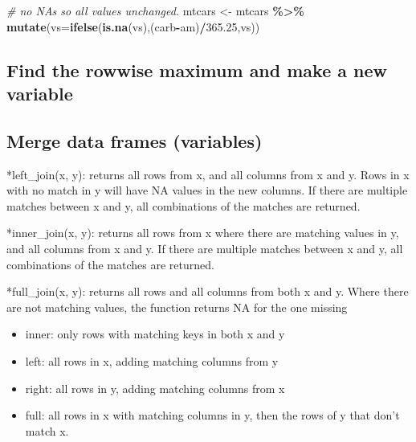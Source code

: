 \documentclass[
]{article}
\newenvironment{Shaded}{\begin{snugshade}}{\end{snugshade}}
\newcommand{\AttributeTok}[1]{\textcolor[rgb]{0.13,0.29,0.53}{#1}}
\newcommand{\CommentTok}[1]{\textcolor[rgb]{0.56,0.35,0.01}{\textit{#1}}}
\newcommand{\FloatTok}[1]{\textcolor[rgb]{0.00,0.00,0.81}{#1}}
\newcommand{\FunctionTok}[1]{\textcolor[rgb]{0.13,0.29,0.53}{\textbf{#1}}}
\newcommand{\NormalTok}[1]{#1}
\newcommand{\OtherTok}[1]{\textcolor[rgb]{0.56,0.35,0.01}{#1}}
\newcommand{\SpecialCharTok}[1]{\textcolor[rgb]{0.81,0.36,0.00}{\textbf{#1}}}
\providecommand{\tightlist}{%
  \setlength{\itemsep}{0pt}\setlength{\parskip}{0pt}}
\begin{document}
\begin{Shaded}
\begin{Highlighting}[]
\CommentTok{\# no NA\textquotesingle{}s so all values unchanged.}
\NormalTok{mtcars }\OtherTok{\textless{}{-}}\NormalTok{ mtcars }\SpecialCharTok{\%\textgreater{}\%} \FunctionTok{mutate}\NormalTok{(}\AttributeTok{vs=}\FunctionTok{ifelse}\NormalTok{(}\FunctionTok{is.na}\NormalTok{(vs),(carb}\SpecialCharTok{{-}}\NormalTok{am)}\SpecialCharTok{/}\FloatTok{365.25}\NormalTok{,vs)) }
\end{Highlighting}
\end{Shaded}

\hypertarget{find-the-rowwise-maximum-and-make-a-new-variable}{%
\subsection{Find the rowwise maximum and make a new variable}\label{find-the-rowwise-maximum-and-make-a-new-variable}}

\hypertarget{merge-data-frames-variables}{%
\subsection{Merge data frames (variables)}\label{merge-data-frames-variables}}

*left\_join(x, y): returns all rows from x, and all columns from x and y. Rows in x with no match in y will have NA values in the new columns. If there are multiple matches between x and y, all combinations of the matches are returned.

*inner\_join(x, y): returns all rows from x where there are matching values in y, and all columns from x and y. If there are multiple matches between x and y, all combinations of the matches are returned.

*full\_join(x, y): returns all rows and all columns from both x and y. Where there are not matching values, the function returns NA for the one missing

\begin{itemize}
\tightlist
\item
  inner: only rows with matching keys in both x and y
\item
  left: all rows in x, adding matching columns from y
\item
  right: all rows in y, adding matching columns from x
\item
  full: all rows in x with matching columns in y, then the rows of y that don't match x.
\end{itemize}
\end{document}
